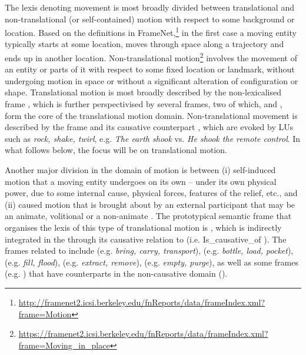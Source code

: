 \documentclass[output=paper,colorlinks,citecolor=brown]{langscibook}
\begin{document}
The lexis denoting movement is most broadly divided between translational and non-translational (or self-contained) motion with respect to some background or location. %
Based on the definitions in FrameNet,\footnote{\url{http://framenet2.icsi.berkeley.edu/fnReports/data/frameIndex.xml?frame=Motion}} in the first case a moving entity typically starts at some location, moves through space along a trajectory and ends up in another location. Non-translational motion\footnote{\url{https://framenet2.icsi.berkeley.edu/fnReports/data/frameIndex.xml?frame=Moving_in_place}} involves the movement of an entity or parts of it with respect to some fixed location or landmark, without undergoing motion in space or without a significant alteration of configuration or shape. Translational motion is most broadly described by the non-lexicalised frame , which is further perspectivised by several frames, two of which,  and , form the core of the translational motion domain. Non-translational movement is described by the  frame and its causative counterpart , which are evoked by LUs such as \textit{rock, shake, twirl}, e.g. \textit{The earth shook} vs. \textit{He shook the remote control}. In what follows below, the focus will be on translational motion.

Another major division in the domain of motion is between (i) self-induced motion that a moving entity undergoes on its own -- under its own physical power, due to some internal cause, physical forces, features of the relief, etc., and (ii) caused motion that is brought about by an external participant that may be an animate, volitional  or a non-animate . The prototypical semantic frame that organises the lexis of this type of translational motion is , which is indirectly integrated in the  through its causative relation to  (i.e.  Is\_causative\_of ). The frames related to  include  (e.g. \textit{bring, carry, transport}),  (e.g. \textit{bottle, load, pocket}),  (e.g. \textit{fill, flood}),  (e.g. \textit{extract, remove}),  (e.g. \textit{empty, purge}), as well as some frames (e.g. ) that have counterparts in the non-causative domain (). %
\end{document}
